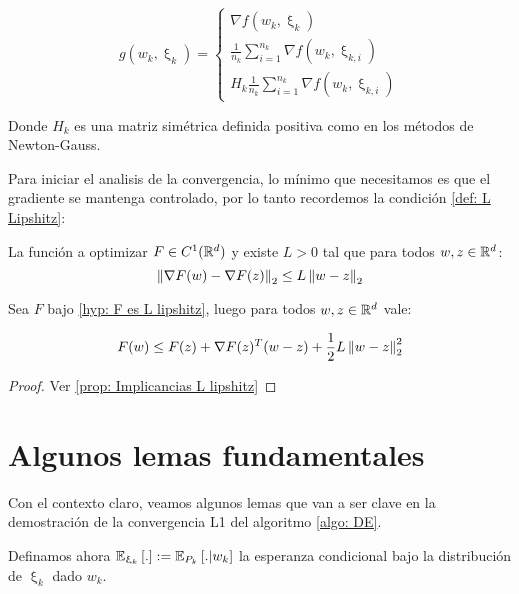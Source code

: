 \begin{equation}
g(w_k, \upxi_k) = \left\lbrace
\begin{aligned}
\nabla f(w_k, \upxi_k) \\
\frac{1}{n_k} \sum\limits_{i=1}^{n_k} {\nabla f (w_k, \upxi_{k,i})}\\
H_k\frac{1}{n_k} \sum\limits_{i=1}^{n_k} {\nabla f (w_k, \upxi_{k,i})}
\end{aligned}
\right.
\end{equation}

Donde $H_k$ es una matriz sim\'etrica definida positiva como en los m\'etodos de Newton-Gauss. 

\smallskip

Para iniciar el analisis de la convergencia, lo m\'inimo que necesitamos es que el gradiente se mantenga controlado, por lo tanto recordemos la condici\'on \ref{def: L Lipshitz}:

\begin{hyp} [$F$ es $l$-Lipshitz]
	\label{hyp: F es L lipshitz}
	La funci\'on a optimizar $F \in C^1({\mathbb{R}}^d)$ y existe $L >0$ tal que para todos $w,z \in {\mathbb{R}}^d$:
	\begin{equation*}
	\left\lVert\nabla F(w) - \nabla F(z)\right\rVert_2 \leq L \left\lVert w-z\right\rVert_2
	\end{equation*} 
\end{hyp}

\begin{remark}
	\label{obs: F es l lipshitz}
	Sea $F$ bajo \ref{hyp: F es L lipshitz}, luego para todos $w,z\in {\mathbb{R}}^d$ vale:
	
	\begin{equation*}
	F(w) \leq F(z) + \nabla F(z)^T(w-z) + \frac{1}{2}L \left\lVert w-z\right\rVert^2_2
	\end{equation*}
	
\end{remark}

\begin{proof}
	Ver \ref{prop: Implicancias L lipshitz}
\end{proof}

\section{Algunos lemas fundamentales}

Con el contexto claro, veamos algunos lemas que van a ser clave en la demostraci\'on de la convergencia L1 del algoritmo \ref{algo: DE}.

Definamos ahora $\mathbb{E}_{\upxi_k} \left[.\right] := \mathbb{E}_{P_k}\left[. \vert w_k\right]$ la esperanza condicional bajo la distribuci\'on de $\upxi_k$ dado $w_k$.

